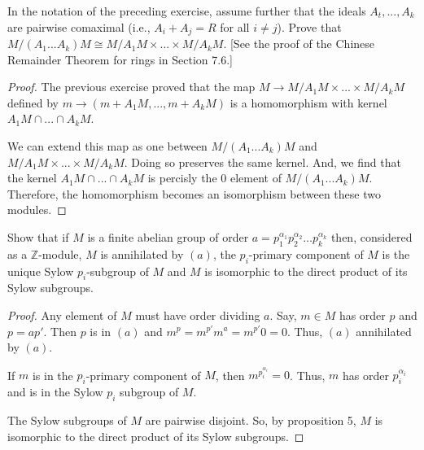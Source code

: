 \documentclass[10pt]{article}
\newcommand{\Z}{\mathbb{Z}}
\newenvironment{problem}[2][Problem]{\begin{trivlist}
		\item[\hskip \labelsep {\bfseries #1}\hskip \labelsep {\bfseries #2.}]}{\end{trivlist}}
\begin{document}
	\begin{problem}{3.17}
		In the notation of the preceding exercise, assume further that the ideals $A_t, ..., A_k$ are
		pairwise comaximal (i.e., $A_i + A_j = R$ for all $i \not= j$). Prove that
		$M/(A_1...A_k)M \cong M/A_1M\times...\times M/A_k M$. [See the proof of the Chinese Remainder Theorem for rings in Section 7.6.]
		\begin{proof}
			The previous exercise proved that the map $M \rightarrow M/A_1M \times ... \times M/A_kM$ defined by $m \rightarrow (m+A_1M,...,m+A_kM)$ is a homomorphism with kernel $A_1M\cap...\cap A_kM$.
			
			We can extend this map as one between $M/(A_1...A_k)M$ and $M/A_1M\times...\times M/A_k M$. Doing so preserves the same kernel. And, we find that the kernel $A_1M\cap...\cap A_kM$ is percisly the $0$ element of $M/(A_1...A_k)M$. Therefore, the homomorphism becomes an isomorphism between these two modules.
		\end{proof}
	\end{problem}
	
	\begin{problem}{3.19}
		Show that if $M$ is a finite abelian group of order $a = p_1^{\alpha_1} p_2^{\alpha_2} \dots p_k^{\alpha_k}$ then, considered as a $\Z$-module, $M$ is annihilated by $(a)$, the $p_i$-primary component of $M$ is the unique Sylow $p_i$-subgroup of $M$ and $M$ is isomorphic to the direct product of its Sylow subgroups.
		\begin{proof}
			Any element of $M$ must have order dividing $a$. Say, $m \in M$ has order $p$ and $p = ap'$. Then $p$ is in $(a)$ and $m^p = m^{p'}m^a = m^{p'}0 = 0$. Thus, $(a)$ annihilated by $(a)$.
			
			If $m$ is in the $p_i$-primary component of $M$, then $m^{p_i^{\alpha_i}}=0$. Thus, $m$ has order $p_i^{\alpha_i}$ and is in the Sylow $p_i$ subgroup of $M$.
			
			The Sylow subgroups of $M$ are pairwise disjoint. So, by proposition 5, $M$ is isomorphic to the direct product of its Sylow subgroups.
		\end{proof}
	\end{problem}
	
\end{document}
